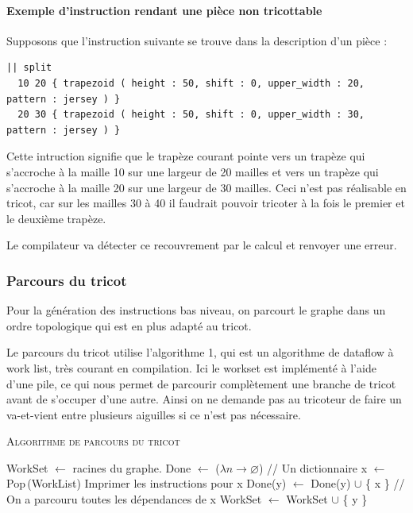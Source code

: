 \documentclass{article}
\begin{document}
\paragraph{Exemple d'instruction rendant une pièce non tricottable\\} 

 Supposons que l'instruction suivante se trouve dans la description d'un pièce :
 
	\begin{lstlisting}
|| split
  10 20 { trapezoid ( height : 50, shift : 0, upper_width : 20, pattern : jersey ) }
  20 30 { trapezoid ( height : 50, shift : 0, upper_width : 30, pattern : jersey ) }
	\end{lstlisting}

 Cette intruction signifie que le trapèze courant pointe vers un trapèze qui s'accroche à la maille 10 sur une largeur de 20 mailles et vers un trapèze qui s'accroche à la maille 20 sur une largeur de 30 mailles. Ceci n'est pas réalisable en tricot, car sur les mailles 30 à 40 il faudrait pouvoir tricoter à la fois le premier et le deuxième trapèze.
 
 Le compilateur va détecter ce recouvrement par le calcul et renvoyer une erreur.



\subsubsection{Parcours du tricot}

Pour la génération des instructions bas niveau, on parcourt le graphe 
dans un ordre topologique qui est en plus adapté au tricot.

Le parcours du tricot utilise l'algorithme 1, qui est un algorithme de
dataflow à work list, très courant en compilation. Ici le workset est
implémenté à l'aide d'une pile, ce qui nous permet de parcourir
complètement une branche de tricot avant de s'occuper d'une
autre. Ainsi on ne demande pas au tricoteur de faire un va-et-vient
entre plusieurs aiguilles si ce n'est pas nécessaire.

\begin{algorithm}\label{algo}
\caption{\textsc{Algorithme de parcours du tricot}}
\begin{algorithmic}[1]
\State WorkSet $\leftarrow$ racines du graphe.
\State Done $\leftarrow$ ($\lambda n \to \varnothing$) // Un dictionnaire
  \State x $\leftarrow$ Pop\,(WorkList)
  \State Imprimer les instructions pour x
    \State Done(y) $\leftarrow$ Done(y) $\cup$ \{ x \}
     // On a parcouru toutes les dépendances de x
      \State WorkSet $\leftarrow$ WorkSet $\cup$ \{ y \}
    \EndIf
  \EndFor
\EndWhile
\end{algorithmic}
\end{algorithm}
\end{document}
